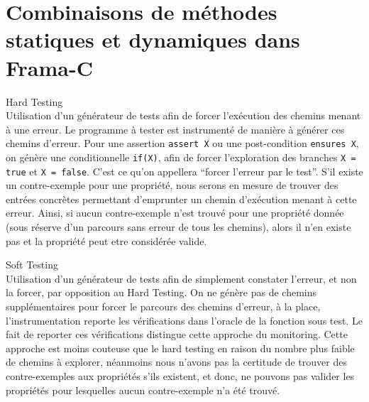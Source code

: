 
\chapter{Combinaisons de méthodes statiques et dynamiques dans Frama-C}

\begin{definition}{Hard Testing}\hfill \\
  Utilisation d'un générateur de tests afin de forcer l'exécution des chemins
  menant à une erreur. Le programme à tester est instrumenté de manière à
  générer ces chemins d'erreur. Pour une assertion \texttt{assert X} ou une
  post-condition \texttt{ensures X}, on génère
  une conditionnelle \texttt{if(X)}, afin de forcer l'exploration des branches
  \texttt{X = true} et \texttt{X = false}. C'est ce qu'on appellera ``forcer
  l'erreur par le test''. S'il existe un contre-exemple pour une propriété,
  nous serons en mesure de trouver des entrées concrètes permettant d'emprunter
  un chemin d'exécution menant à cette erreur. Ainsi, si aucun contre-exemple
  n'est trouvé pour une propriété donnée (sous réserve d'un parcours sans erreur
  de tous les chemins), alors il n'en existe pas et la propriété peut etre
  considérée valide.
\end{definition}

\begin{definition}{Soft Testing}\hfill \\
  Utilisation d'un générateur de tests afin de simplement constater l'erreur,
  et non la forcer, par opposition au Hard Testing.
  On ne génère pas de chemins supplémentaires pour forcer le parcours
  des chemins d'erreur, à la place, l'instrumentation reporte les vérifications
  dans l'oracle de la fonction sous test. Le fait de reporter ces vérifications
  distingue cette approche du monitoring. Cette approche est moins couteuse que
  le hard testing en raison du nombre plus faible de chemins à explorer,
  néanmoins nous n'avons pas la certitude de trouver des contre-exemples aux
  propriétés s'ils existent, et donc, ne pouvons pas valider les propriétés
  pour lesquelles aucun contre-exemple n'a été trouvé.
\end{definition}
